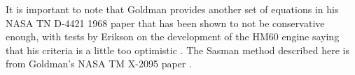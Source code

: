 





It is important to note that Goldman provides another set of equations in his NASA TN D-4421 1968 paper \cite{goldmanAnalyticalInvestigationSupersonic1968} that has been shown to not be conservative enough, with tests by Erikson on the development of the HM60 engine saying that his criteria is a little too optimistic \cite{erikssonDevelopmentSupersonicTurbine}. The Sasman method described here is from Goldman's NASA TM X-2095 paper \cite{goldmanAnalyticalInvestigationBlade1970}.

